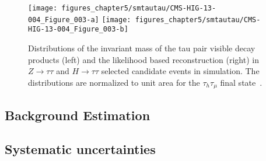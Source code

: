 \begin{figure}[htbp]
\centering
\texttt{[image: figures\_chapter5/smtautau/CMS-HIG-13-004\_Figure\_003-a]}
\texttt{[image: figures\_chapter5/smtautau/CMS-HIG-13-004\_Figure\_003-b]}
\caption{Distributions of the invariant mass of the tau pair visible decay products (left) and the likelihood based reconstruction (right) in $Z \rightarrow \tau\tau$ and $H \rightarrow \tau\tau$ selected candidate events in simulation. The distributions are normalized to unit area for the $\tau_{h}\tau_{\mu}$ final state~\cite{Chatrchyan:2014nva}.}
\label{fig:svfit}
\end{figure}

\subsection{Background Estimation}





\subsection{Systematic uncertainties}


